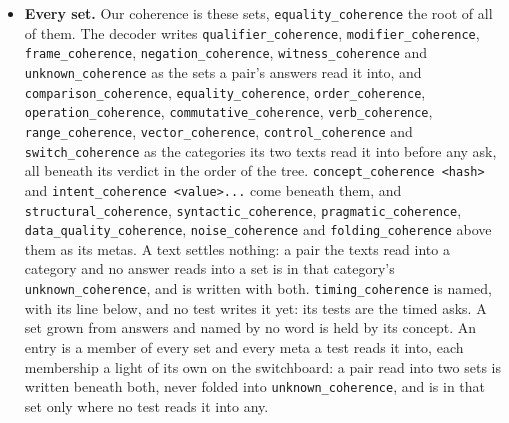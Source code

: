 \begin{itemize}
\item \textbf{Every set.} Our coherence is these sets, \texttt{equality\_\allowbreak{}coherence} the root of all of them. The decoder writes \texttt{qualifier\_\allowbreak{}coherence}, \texttt{modifier\_\allowbreak{}coherence}, \texttt{frame\_\allowbreak{}coherence}, \texttt{negation\_\allowbreak{}coherence}, \texttt{witness\_\allowbreak{}coherence} and \texttt{unknown\_\allowbreak{}coherence} as the sets a pair's answers read it into, and \texttt{comparison\_\allowbreak{}coherence}, \texttt{equality\_\allowbreak{}coherence}, \texttt{order\_\allowbreak{}coherence}, \texttt{operation\_\allowbreak{}coherence}, \texttt{commutative\_\allowbreak{}coherence}, \texttt{verb\_\allowbreak{}coherence}, \texttt{range\_\allowbreak{}coherence}, \texttt{vector\_\allowbreak{}coherence}, \texttt{control\_\allowbreak{}coherence} and \texttt{switch\_\allowbreak{}coherence} as the categories its two texts read it into before any ask, all beneath its verdict in the order of the tree. \texttt{concept\_\allowbreak{}coherence <hash>} and \texttt{intent\_\allowbreak{}coherence <value>.\allowbreak{}.\allowbreak{}.\allowbreak{}} come beneath them, and \texttt{structural\_\allowbreak{}coherence}, \texttt{syntactic\_\allowbreak{}coherence}, \texttt{pragmatic\_\allowbreak{}coherence}, \texttt{data\_\allowbreak{}quality\_\allowbreak{}coherence}, \texttt{noise\_\allowbreak{}coherence} and \texttt{folding\_\allowbreak{}coherence} above them as its metas. A text settles nothing: a pair the texts read into a category and no answer reads into a set is in that category's \texttt{unknown\_\allowbreak{}coherence}, and is written with both. \texttt{timing\_\allowbreak{}coherence} is named, with its line below, and no test writes it yet: its tests are the timed asks. A set grown from answers and named by no word is held by its concept. An entry is a member of every set and every meta a test reads it into, each membership a light of its own on the switchboard: a pair read into two sets is written beneath both, never folded into \texttt{unknown\_\allowbreak{}coherence}, and is in that set only where no test reads it into any.

\end{itemize}

